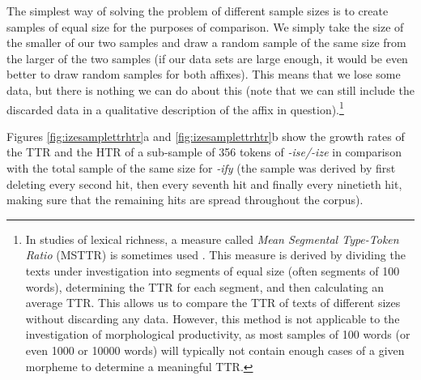 The simplest way of solving the problem of different sample sizes  is to create samples of equal size for the purposes of comparison. We simply take the size of the smaller of our two samples and draw a random sample of the same size from the larger of the two samples (if our data sets are large enough, it would be even better to draw random samples for both affixes).  This means that we lose some data, but there is nothing we can do about this (note that we can still include the discarded data in a qualitative  description  of the affix  in question).\footnote{In studies of lexical richness, a measure called \textit{Mean Segmental Type\hyp{}Token Ratio} (MSTTR)  is sometimes used \citep[cf.][]{johnson_program_1944}. This measure is derived by dividing the texts under investigation into segments of equal size (often segments of 100 words), determining the TTR  for each segment, and then calculating an average TTR. This allows us to compare the TTR of texts of different sizes without discarding any data. However, this method is not applicable to the investigation of morphological  productivity,  as most samples of 100 words (or even 1000 or \num{10000} words) will typically not contain enough cases of a given morpheme to determine a meaningful TTR.}

Figures \ref{fig:izesamplettrhtr}a and \ref{fig:izesamplettrhtr}b show the growth rates of the TTR  and the HTR  of a sub\hyp{}sample of 356 tokens of \textit{-ise/-ize} in comparison with the total sample of the same size for \textit{-ify} (the sample was derived by first deleting every second hit,  then every seventh hit and finally every ninetieth hit, making sure that the remaining hits are spread throughout the corpus).

